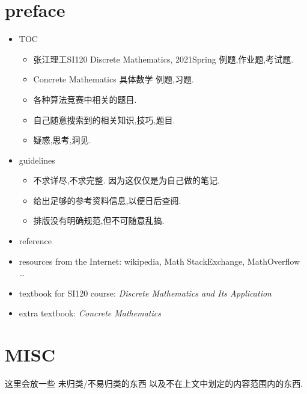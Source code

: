 \documentclass{article}
\begin{document}
\section{preface}
\begin{itemize}
	\item TOC
		\begin{itemize}
			\item 张江理工SI120 Discrete Mathematics, 2021Spring 例题,作业题,考试题.
			\item Concrete Mathematics 具体数学 例题,习题.
			\item 各种算法竞赛中相关的题目.
			\item 自己随意搜索到的相关知识,技巧,题目.
			\item 疑惑,思考,洞见.
		\end{itemize}
	\item guidelines
		\begin{itemize}
			\item 不求详尽,不求完整. 因为这仅仅是为自己做的笔记.
			\item 给出足够的参考资料信息,以便日后查阅.
			\item 排版没有明确规范,但不可随意乱搞.
		\end{itemize}
	\item reference
		\item resources from the Internet: wikipedia, Math StackExchange, MathOverflow \ldots
		\item textbook for SI120 course: \textit{Discrete Mathematics and Its Application}
		\item extra textbook: \textit{Concrete Mathematics}
\end{itemize}
\newpage

\tableofcontents

\newpage

\section{MISC}

这里会放一些 未归类/不易归类的东西 以及不在上文中划定的内容范围内的东西.
\end{document}
